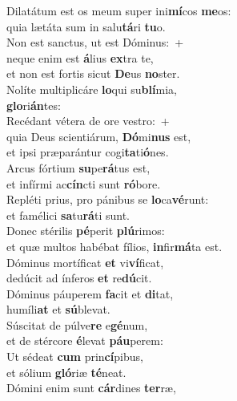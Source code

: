 \evenverse Dilatátum est os meum super ini\textbf{mí}cos \textbf{me}os:~\*\\
\evenverse quia lætáta sum in salu\textbf{tá}ri \textbf{tu}o.\\
\oddverse Non est sanctus, ut est Dóminus:~+\\
\oddverse  neque enim est \textbf{á}lius \textbf{ex}tra te,~\*\\
\oddverse et non est fortis sicut \textbf{De}us \textbf{no}ster.\\
\evenverse Nolíte multiplicáre \textbf{lo}qui su\textbf{blí}mia,~\*\\
\evenverse \textbf{glo}ri\textbf{án}tes:\\
\oddverse Recédant vétera de ore vestro:~+\\
\oddverse  quia Deus scientiárum, \textbf{Dó}mi\textbf{nus} est,~\*\\
\oddverse et ipsi præparántur cogi\textbf{ta}ti\textbf{ó}nes.\\
\evenverse Arcus fórtium \textbf{su}pe\textbf{rá}tus est,~\*\\
\evenverse et infírmi ac\textbf{cín}cti sunt \textbf{ró}bore.\\
\oddverse Repléti prius, pro pánibus se \textbf{lo}ca\textbf{vé}runt:~\*\\
\oddverse et famélici \textbf{sa}tu\textbf{rá}ti sunt.\\
\evenverse Donec stérilis \textbf{pé}perit \textbf{plú}rimos:~\*\\
\evenverse et quæ multos habébat fílios, \textbf{in}fir\textbf{má}ta est.\\
\oddverse Dóminus mortíficat \textbf{et} vi\textbf{ví}ficat,~\*\\
\oddverse dedúcit ad ínferos \textbf{et} re\textbf{dú}cit.\\
\evenverse Dóminus páuperem \textbf{fa}cit et \textbf{di}tat,~\*\\
\evenverse humíli\textbf{at} et \textbf{sú}blevat.\\
\oddverse Súscitat de púlve\textbf{re} e\textbf{gé}num,~\*\\
\oddverse et de stércore \textbf{é}levat \textbf{páu}perem:\\
\evenverse Ut sédeat \textbf{cum} prin\textbf{cí}pibus,~\*\\
\evenverse et sólium \textbf{gló}riæ \textbf{té}neat.\\
\oddverse Dómini enim sunt \textbf{cár}dines \textbf{ter}ræ,~\*\\
